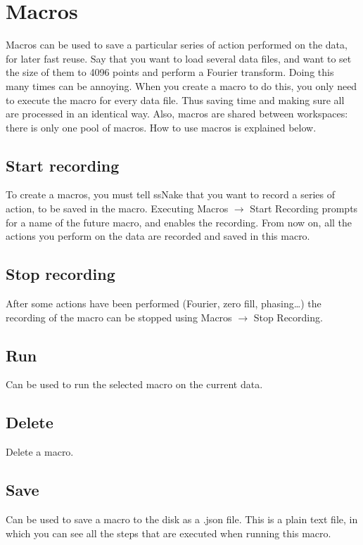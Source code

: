 \documentclass[11pt,a4paper]{article}
\begin{document}
\section{Macros}
Macros can be used to save a particular series of action performed on the data, for later fast reuse. Say that you want to load several data files, and want to set the size of them to 4096 points and perform a Fourier transform. Doing this many times can be annoying. When you create a macro to do this, you only need to execute the macro for every data file. Thus saving time and making sure all are processed in an identical way. Also, macros are shared between workspaces: there is only one pool of macros. How to use macros is explained below. 

\subsection{Start recording}
To create a macros, you must tell ssNake that you want to record a series of action, to be saved in the macro. Executing Macros $\rightarrow$ Start Recording prompts for a name of the future macro, and enables the recording. From now on, all the actions you perform on the data are recorded and saved in this macro.

\subsection{Stop recording}
After some actions have been performed (Fourier, zero fill, phasing\ldots   ) the recording of the macro can be stopped using Macros $\rightarrow$ Stop Recording. 

\subsection{Run}
Can be used to run the selected macro on the current data.

\subsection{Delete}
Delete a macro.

\subsection{Save}
Can be used to save a macro to the disk as a .json file. This is a plain text file, in which you can see all the steps that are executed when running this macro.
\end{document}

